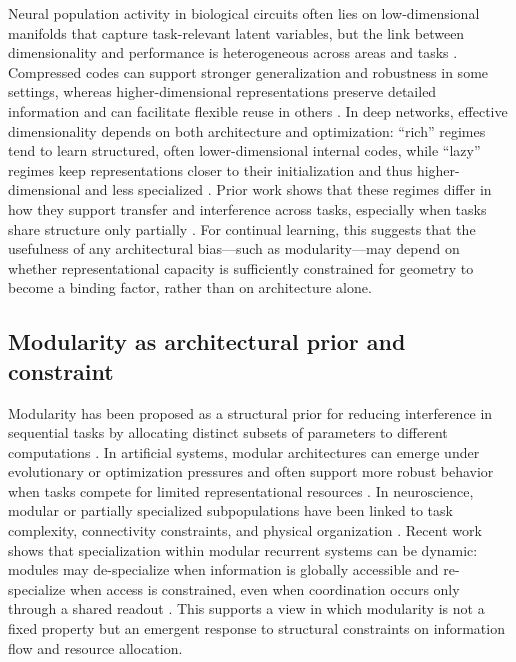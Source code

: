 \documentclass{article}
\theoremstyle{plain}
\theoremstyle{definition}
\theoremstyle{remark}
\begin{document}
Neural population activity in biological circuits often lies on low-dimensional manifolds that capture task-relevant latent variables, but the link between dimensionality and performance is heterogeneous across areas and tasks \cite{yu2025dimensionality}. Compressed codes can support stronger generalization and robustness in some settings, whereas higher-dimensional representations preserve detailed information and can facilitate flexible reuse in others \cite{yu2025dimensionality}. In deep networks, effective dimensionality depends on both architecture and optimization: “rich” regimes tend to learn structured, often lower-dimensional internal codes, while “lazy” regimes keep representations closer to their initialization and thus higher-dimensional and less specialized \cite{flesch2022representation}. Prior work shows that these regimes differ in how they support transfer and interference across tasks, especially when tasks share structure only partially \cite{flesch2022representation,holton2025humans}. For continual learning, this suggests that the usefulness of any architectural bias—such as modularity—may depend on whether representational capacity is sufficiently constrained for geometry to become a binding factor, rather than on architecture alone.

\subsection{Modularity as architectural prior and constraint}

Modularity has been proposed as a structural prior for reducing interference in sequential tasks by allocating distinct subsets of parameters to different computations \cite{ellefsen2015neural,mathis2025leveraging,achterberg2023spatially,salatiello2026modularitybedrocknaturalartificial}. In artificial systems, modular architectures can emerge under evolutionary or optimization pressures and often support more robust behavior when tasks compete for limited representational resources \cite{clune2013evolutionary,yue2017brain,ellefsen2015neural}. In neuroscience, modular or partially specialized subpopulations have been linked to task complexity, connectivity constraints, and physical organization \cite{yue2017brain,gu2024emergence}. Recent work shows that specialization within modular recurrent systems can be dynamic: modules may de-specialize when information is globally accessible and re-specialize when access is constrained, even when coordination occurs only through a shared readout \cite{bena2025dynamics}. This supports a view in which modularity is not a fixed property but an emergent response to structural constraints on information flow and resource allocation.
\end{document}
